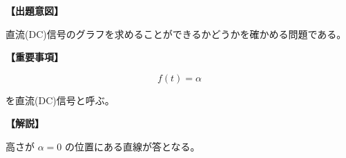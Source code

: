\noindent \textbf{【出題意図】}

\noindent 直流(DC)信号のグラフを求めることができるかどうかを確かめる問題である。

\vspace{1em}
\noindent \textbf{【重要事項】}

\[
f(t) = \alpha
\]

\medskip
\noindent を直流(DC)信号と呼ぶ。


\vspace{1em}
\noindent \textbf{【解説】}

\noindent 高さが $\alpha = 0$ の位置にある直線が答となる。
